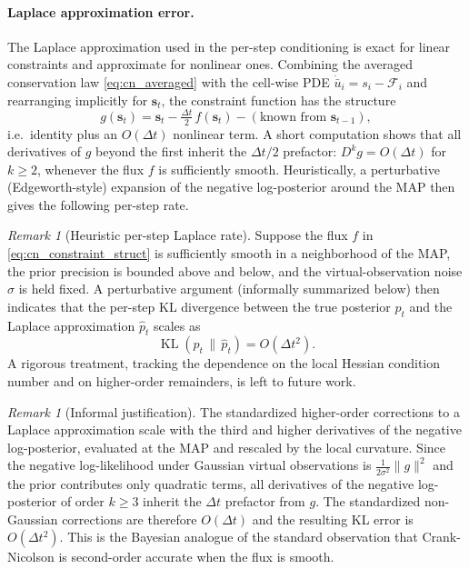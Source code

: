 \documentclass{article}
\theoremstyle{plain}
\theoremstyle{definition}
\theoremstyle{remark}
\newtheorem{remark}[theorem]{Remark}
\DeclareMathOperator{\KL}{KL}
\begin{document}
\paragraph{Laplace approximation error.}
The Laplace approximation used in the per-step conditioning is exact for linear constraints and approximate for nonlinear ones.
Combining the averaged conservation law \eqref{eq:cn_averaged} with the cell-wise PDE $\dot{\bar{u}}_i = s_i - \mathcal{F}_i$ and rearranging implicitly for $\bm{s}_t$, the constraint function has the structure
\begin{equation}\label{eq:cn_constraint_struct}
g(\bm{s}_t) = \bm{s}_t - \tfrac{\Delta t}{2}\, f(\bm{s}_t) - (\text{known from } \bm{s}_{t-1}),
\end{equation}
i.e.\ identity plus an $O(\Delta t)$ nonlinear term.
A short computation shows that all derivatives of $g$ beyond the first inherit the $\Delta t/2$ prefactor: $D^k g = O(\Delta t)$ for $k \geq 2$, whenever the flux $f$ is sufficiently smooth.
Heuristically, a perturbative (Edgeworth-style) expansion of the negative log-posterior around the MAP then gives the following per-step rate.

\begin{remark}[Heuristic per-step Laplace rate]
\label{prop:laplace_cn}
Suppose the flux $f$ in \eqref{eq:cn_constraint_struct} is sufficiently smooth in a neighborhood of the MAP, the prior precision is bounded above and below, and the virtual-observation noise $\sigma$ is held fixed.
A perturbative argument (informally summarized below) then indicates that the per-step KL divergence between the true posterior $p_t$ and the Laplace approximation $\hat{p}_t$ scales as
\begin{equation}\label{eq:laplace_cn_rate}
\KL(p_t \,\|\, \hat{p}_t) = O(\Delta t^2).
\end{equation}
A rigorous treatment, tracking the dependence on the local Hessian condition number and on higher-order remainders, is left to future work.
\end{remark}

\begin{remark}[Informal justification]
The standardized higher-order corrections to a Laplace approximation scale with the third and higher derivatives of the negative log-posterior, evaluated at the MAP and rescaled by the local curvature.
Since the negative log-likelihood under Gaussian virtual observations is $\tfrac{1}{2\sigma^2}\|g\|^2$ and the prior contributes only quadratic terms, all derivatives of the negative log-posterior of order $k\geq 3$ inherit the $\Delta t$ prefactor from $g$.
The standardized non-Gaussian corrections are therefore $O(\Delta t)$ and the resulting KL error is $O(\Delta t^2)$.
This is the Bayesian analogue of the standard observation that Crank-Nicolson is second-order accurate when the flux is smooth.
\end{remark}
\end{document}
